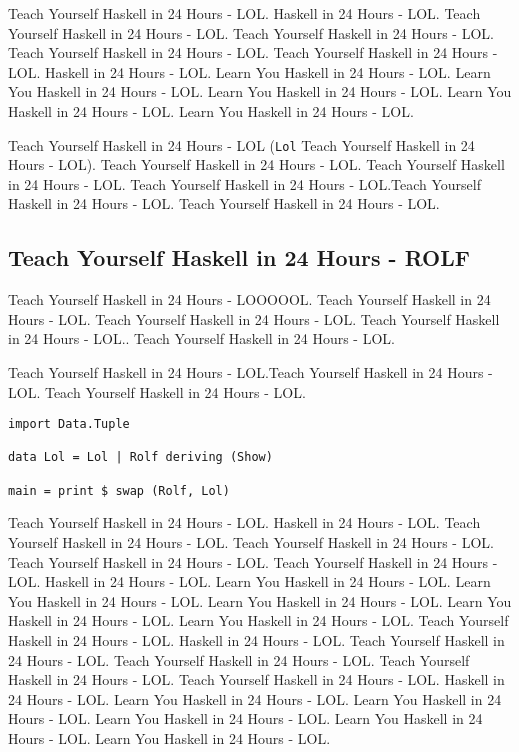 Teach Yourself Haskell in 24 Hours - LOL.  Haskell in 24 Hours - LOL. Teach Yourself Haskell in 24 Hours - LOL. Teach Yourself Haskell in 24 Hours - LOL. Teach Yourself Haskell in 24 Hours - LOL. Teach Yourself Haskell in 24 Hours - LOL.  Haskell in 24 Hours - LOL. Learn You Haskell in 24 Hours - LOL. Learn You Haskell in 24 Hours - LOL. Learn You Haskell in 24 Hours - LOL. Learn You Haskell in 24 Hours - LOL. Learn You Haskell in 24 Hours - LOL.

Teach Yourself Haskell in 24 Hours - LOL (\texttt{Lol} Teach Yourself Haskell in 24 Hours - LOL). Teach Yourself Haskell in 24 Hours - LOL. Teach Yourself Haskell in 24 Hours - LOL. Teach Yourself Haskell in 24 Hours - LOL.Teach Yourself Haskell in 24 Hours - LOL. Teach Yourself Haskell in 24 Hours - LOL.

\subsection{Teach Yourself Haskell in 24 Hours - ROLF}

Teach Yourself Haskell in 24 Hours - LOOOOOL. Teach Yourself Haskell in 24 Hours - LOL. Teach Yourself Haskell in 24 Hours - LOL. Teach Yourself Haskell in 24 Hours - LOL.. Teach Yourself Haskell in 24 Hours - LOL.

Teach Yourself Haskell in 24 Hours - LOL.Teach Yourself Haskell in 24 Hours - LOL. Teach Yourself Haskell in 24 Hours - LOL.

\begin{verbatim}
import Data.Tuple

data Lol = Lol | Rolf deriving (Show)

main = print $ swap (Rolf, Lol)
\end{verbatim}

Teach Yourself Haskell in 24 Hours - LOL.  Haskell in 24 Hours - LOL. Teach Yourself Haskell in 24 Hours - LOL. Teach Yourself Haskell in 24 Hours - LOL. Teach Yourself Haskell in 24 Hours - LOL. Teach Yourself Haskell in 24 Hours - LOL.  Haskell in 24 Hours - LOL. Learn You Haskell in 24 Hours - LOL. Learn You Haskell in 24 Hours - LOL. Learn You Haskell in 24 Hours - LOL. Learn You Haskell in 24 Hours - LOL. Learn You Haskell in 24 Hours - LOL.
Teach Yourself Haskell in 24 Hours - LOL.  Haskell in 24 Hours - LOL. Teach Yourself Haskell in 24 Hours - LOL. Teach Yourself Haskell in 24 Hours - LOL. Teach Yourself Haskell in 24 Hours - LOL. Teach Yourself Haskell in 24 Hours - LOL.  Haskell in 24 Hours - LOL. Learn You Haskell in 24 Hours - LOL. Learn You Haskell in 24 Hours - LOL. Learn You Haskell in 24 Hours - LOL. Learn You Haskell in 24 Hours - LOL. Learn You Haskell in 24 Hours - LOL.

